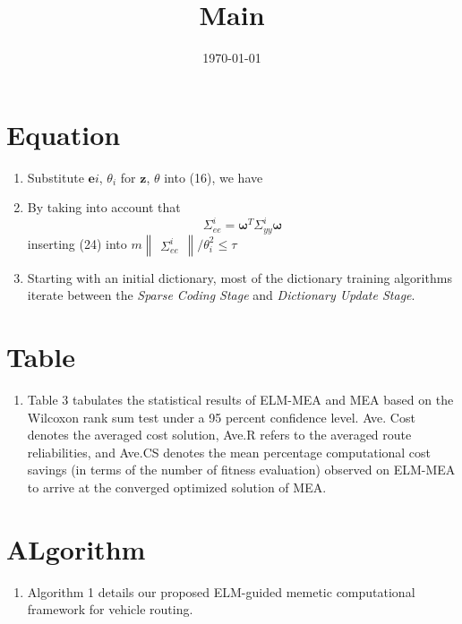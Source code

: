 \documentclass[onecolumn,conference]{IEEEtran}
\begin{document}
\title{Main}
\author{\today}
\maketitle
\section{Equation}
\begin{enumerate}
\item Substitute $\mathbf{e}i$, $\theta_i$ for $\mathbf{z}$, $\theta$ into (16), we have \cite{Lu2016}
\item By taking into account that
\begin{equation*}
\Sigma_{ee}^i=\mathbf{\omega}^T\Sigma_{yy}^i\mathbf{\omega}
\end{equation*}
inserting (24) into $m\begin{Vmatrix}\Sigma_{ee}^i\end{Vmatrix}/\theta_i^2\leqslant \tau$ \cite{Lu2016}
\item Starting with an initial dictionary, most of the dictionary training algorithms iterate between the \textit{Sparse Coding Stage} and \textit{Dictionary Update Stage}. \cite{Sahoo2015}
\end{enumerate}
\section{Table}
\begin{enumerate}
\item Table 3 tabulates the statistical results of ELM-MEA and MEA based on the Wilcoxon rank sum test under a 95 percent confidence level. Ave. Cost denotes the averaged cost solution, Ave.R refers to the averaged route reliabilities, and Ave.CS denotes the mean percentage computational cost savings (in terms of the number of fitness evaluation) observed on ELM-MEA to arrive at the converged optimized solution of MEA.\cite{Kasun2013}
\end{enumerate}
\section{ALgorithm}
\begin{enumerate}
\item Algorithm 1 details our proposed ELM-guided memetic computational framework for vehicle routing.\cite{Kasun2013}
\end{enumerate}


\end{document}
